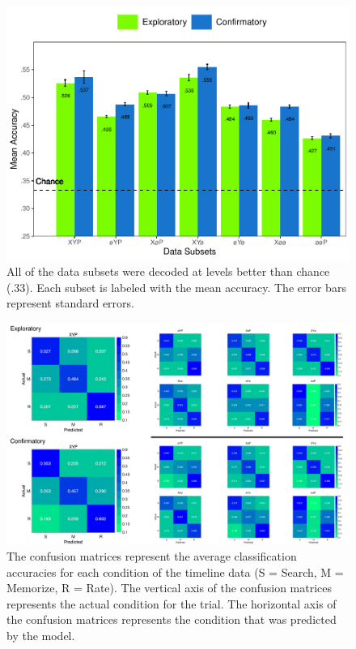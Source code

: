 \documentclass[
  english,
  man, donotrepeattitle,floatsintext]{apa6}
\begin{document}
\begin{figure}
\centering
\includegraphics{figures/r_code/timeline_subset_chance.pdf}
\caption{\label{fig:timeline-parcellation-chance}All of the data subsets were decoded at levels better than chance (.33). Each subset is labeled with the mean accuracy. The error bars represent standard errors.}
\end{figure}

\begin{figure}
\centering
\includegraphics{figures/timeline_conf_matrices.pdf}
\caption{\label{fig:timeline-conf-matrices}The confusion matrices represent the average classification accuracies for each condition of the timeline data (S = Search, M = Memorize, R = Rate). The vertical axis of the confusion matrices represents the actual condition for the trial. The horizontal axis of the confusion matrices represents the condition that was predicted by the model.}
\end{figure}
\end{document}
